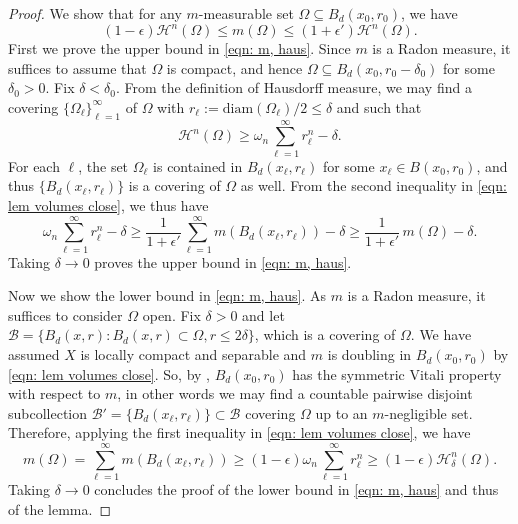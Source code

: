 \documentclass[11pt,reqno]{amsart}
\theoremstyle{remark}
\theoremstyle{definition}
\numberwithin{equation}{section}
\newcommand{\e}{{\epsilon}}
\newcommand{\Hi}{{\mathcal{H}}}
\newcommand{\Om}{\Omega}
\newcommand{\om}{\omega}
\begin{document}
\begin{proof} We show that for any $m$-measurable set $\Omega\subseteq B_d(x_0,r_0)$,  we have 
\begin{equation}\label{eqn: m, haus}
	(1-\e) \Hi^n(\Omega)\leq m(\Omega) \leq (1+\e')\Hi^n(\Om).
\end{equation}
First we prove the upper bound in \eqref{eqn: m, haus}. Since $m$ is a Radon measure, it suffices to assume that $\Omega$ is compact, and hence $\Om \subseteq B_d(x_0,r_0-\delta_0)$ for some $\delta_0>0$. Fix $\delta<\delta_0$. From the definition of Hausdorff measure, we may find a covering $\{\Om_\ell\}_{\ell=1}^\infty$ of $\Omega$ with $r_\ell:=\text{diam}(\Om_\ell)/2  \leq \delta$ and such that
\begin{equation}
	\Hi^n(\Omega) \geq \om_n\sum_{\ell=1}^\infty r_\ell^n -\delta.
\end{equation}
 For each $\ell$, the set $\Om_\ell$ is contained in $B_d(x_\ell,r_\ell)$ for some $x_\ell\in B(x_0,r_0)$, and thus $\{B_d(x_\ell,r_\ell)\}$ is a covering of $\Omega$ as well. From the second inequality  in \eqref{eqn: lem volumes close}, we thus have
 \begin{equation}
 	\om_n\sum_{\ell=1}^\infty r_\ell^n -\delta \geq \frac{1}{1+\e'}\sum_{\ell=1}^\infty m(B_d(x_\ell,r_\ell)) -\delta \geq \frac{1}{1+\e'}\, m(\Omega)-\delta.
 \end{equation}
 Taking $\delta\to 0$ proves the upper bound in \eqref{eqn: m, haus}. 
 
 Now we show the lower bound in \eqref{eqn: m, haus}. As $m$ is a Radon measure, it suffices to consider $\Omega$ open. Fix $\delta>0$ and let $\mathcal{B} = \{ B_d(x,r) :  B_d(x,r) \subset \Omega, r\leq 2\delta\}$, which is a covering of $\Omega$. We have assumed $X$ is locally compact and separable and $m$ is doubling in $B_d(x_0,r_0)$ by \eqref{eqn: lem volumes close}. So, by \cite[Remark 4.5(1)]{simonGMT},  $B_d(x_0, r_0)$ has the symmetric Vitali property with respect to $m$, in other words  we may find a countable pairwise disjoint subcollection $\mathcal{B}'= \{ B_d(x_\ell,r_\ell)\} \subset \mathcal{B}$ covering $\Omega$ up to an $m$-negligible set. Therefore, applying the first inequality in \eqref{eqn: lem volumes close}, we have
 \begin{equation}
 	m(\Omega)= \sum_{\ell=1}^\infty m( B_d(x_\ell,r_\ell) ) \geq (1-\e)\om_n \sum_{\ell=1}^\infty r_\ell^n \geq (1-\e)\Hi^n_\delta(\Omega).
 \end{equation}
Taking $\delta\to 0$ concludes the proof of the lower bound in \eqref{eqn: m, haus} and thus of the lemma.
\end{proof}
\end{document}

